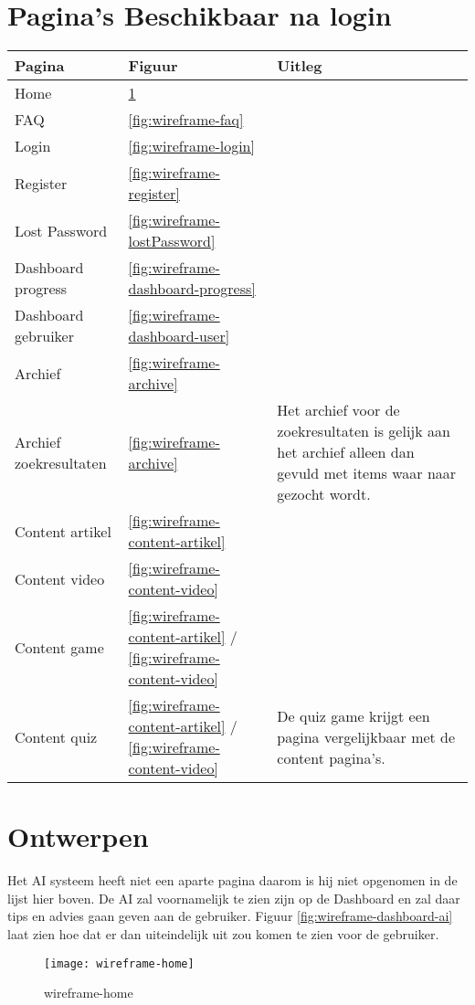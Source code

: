 \documentclass[]{report}
\begin{document}
\section{Pagina's Beschikbaar na login}
\begin{tabular}{ l l p{6cm} }
	\textbf{Pagina} & \textbf{Figuur} & \textbf{Uitleg}\\ \hline
	Home 					& \ref{fig:wireframe-home}	\\
	FAQ 					& \ref{fig:wireframe-faq}	\\
	Login 					& \ref{fig:wireframe-login}	\\
	Register 				& \ref{fig:wireframe-register}	\\
	Lost Password			& \ref{fig:wireframe-lostPassword} \\
	Dashboard progress 		& \ref{fig:wireframe-dashboard-progress}	\\
	Dashboard gebruiker		& \ref{fig:wireframe-dashboard-user}	\\
	Archief 				& \ref{fig:wireframe-archive}	\\
	Archief zoekresultaten	& \ref{fig:wireframe-archive}	& Het archief voor de zoekresultaten is gelijk aan het archief alleen dan gevuld met items waar naar gezocht wordt.\\
	Content artikel 		& \ref{fig:wireframe-content-artikel}	\\
	Content video 			& \ref{fig:wireframe-content-video} 	\\
	Content game 			& \ref{fig:wireframe-content-artikel} / \ref{fig:wireframe-content-video}	& \\
	Content quiz 			& \ref{fig:wireframe-content-artikel} / \ref{fig:wireframe-content-video}  & De quiz game krijgt een pagina vergelijkbaar met de content pagina's. \\
\end{tabular}

\section{Ontwerpen}

Het AI systeem heeft niet een aparte pagina daarom is hij niet opgenomen in de lijst hier boven. De AI zal voornamelijk te zien zijn op de Dashboard en zal daar tips en advies gaan geven aan de gebruiker. Figuur \ref{fig:wireframe-dashboard-ai} laat zien hoe dat er dan uiteindelijk uit zou komen te zien voor de gebruiker.

\begin{figure}
	\centering
	\texttt{[image: wireframe-home]}
	\caption{wireframe-home}
	\label{fig:wireframe-home}
\end{figure}
\end{document}
